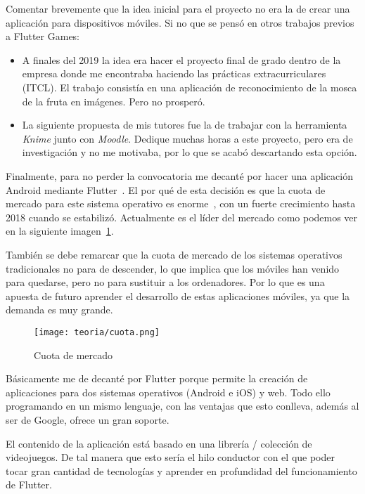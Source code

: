 
Comentar brevemente que la idea inicial para el proyecto no era la de crear una aplicación para dispositivos móviles. Si no que se pensó en otros trabajos previos a Flutter Games:

\begin{itemize}
	\item A finales del 2019 la idea era hacer el proyecto final de grado dentro de la empresa donde me encontraba haciendo las prácticas extracurriculares (ITCL). El trabajo consistía en una aplicación de reconocimiento de la mosca de la fruta en imágenes. Pero no prosperó.
	
	\item La siguiente propuesta de mis tutores fue la de trabajar con la herramienta \emph{Knime} junto con \emph{Moodle}. Dedique muchas horas a este proyecto, pero era de investigación y no me motivaba, por lo que se acabó descartando esta opción.
\end{itemize}

Finalmente, para no perder la convocatoria me decanté por hacer una aplicación Android mediante Flutter~\cite{wiki:flutter}. El por qué de esta decisión es que la cuota de mercado para este sistema operativo es enorme~\cite{wiki:marketOS}, con un fuerte crecimiento hasta 2018 cuando se estabilizó. Actualmente es el líder del mercado como podemos ver en la siguiente imagen~\ref{fig:cuota}. 

También se debe remarcar que la cuota de mercado de los sistemas operativos tradicionales no para de descender, lo que implica que los móviles han venido para quedarse, pero no para sustituir a los ordenadores. Por lo que es una apuesta de futuro aprender el desarrollo de estas aplicaciones móviles, ya que la demanda es muy grande.

\begin{figure}[H]
	\centering
	\texttt{[image: teoria/cuota.png]}
	\caption{Cuota de mercado}\label{fig:cuota}
\end{figure}

Básicamente me de decanté por Flutter porque permite la creación de aplicaciones para dos sistemas operativos (Android e iOS) y web. Todo ello programando en un mismo lenguaje, con las ventajas que esto conlleva, además al ser de Google, ofrece un gran soporte.

El contenido de la aplicación está basado en una librería / colección de  videojuegos. De tal manera que esto sería el hilo conductor con el que poder tocar gran cantidad de tecnologías y aprender en profundidad del funcionamiento de Flutter.

